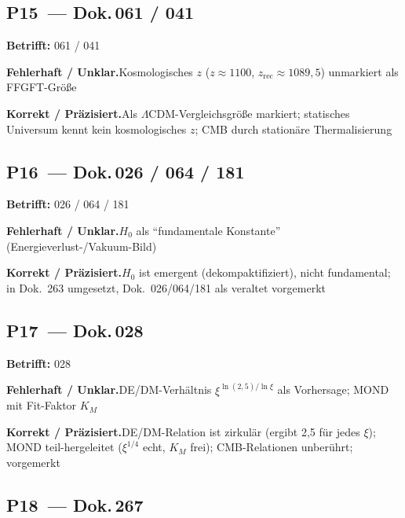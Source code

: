 \medskip


\subsection*{P15~--- Dok.\,061 / 041}

\noindent\textbf{Betrifft:} 061 / 041


\smallskip\noindent\textbf{Fehlerhaft / Unklar.}\quad Kosmologisches $z$ ($z\approx 1100$, $z_{\text{rec}}\approx 1089{,}5$) unmarkiert als FFGFT-Größe


\smallskip\noindent\textbf{Korrekt / Präzisiert.}\quad Als $\Lambda$CDM-Vergleichsgröße markiert; statisches Universum kennt kein kosmologisches $z$; CMB durch stationäre Thermalisierung


\medskip


\subsection*{P16~--- Dok.\,026 / 064 / 181}

\noindent\textbf{Betrifft:} 026 / 064 / 181


\smallskip\noindent\textbf{Fehlerhaft / Unklar.}\quad $H_0$ als \enquote{fundamentale Konstante} (Energieverlust-/Vakuum-Bild)


\smallskip\noindent\textbf{Korrekt / Präzisiert.}\quad $H_0$ ist emergent (dekompaktifiziert), nicht fundamental; in Dok.~263 umgesetzt, Dok.~026/064/181 als veraltet vorgemerkt


\medskip


\subsection*{P17~--- Dok.\,028}

\noindent\textbf{Betrifft:} 028


\smallskip\noindent\textbf{Fehlerhaft / Unklar.}\quad DE/DM-Verhältnis $\xi^{\ln(2{,}5)/\ln\xi}$ als Vorhersage; MOND mit Fit-Faktor $K_M$


\smallskip\noindent\textbf{Korrekt / Präzisiert.}\quad DE/DM-Relation ist zirkulär (ergibt 2,5 für jedes $\xi$); MOND teil-hergeleitet ($\xi^{1/4}$ echt, $K_M$ frei); CMB-Relationen unberührt; vorgemerkt


\medskip


\subsection*{P18~--- Dok.\,267}

